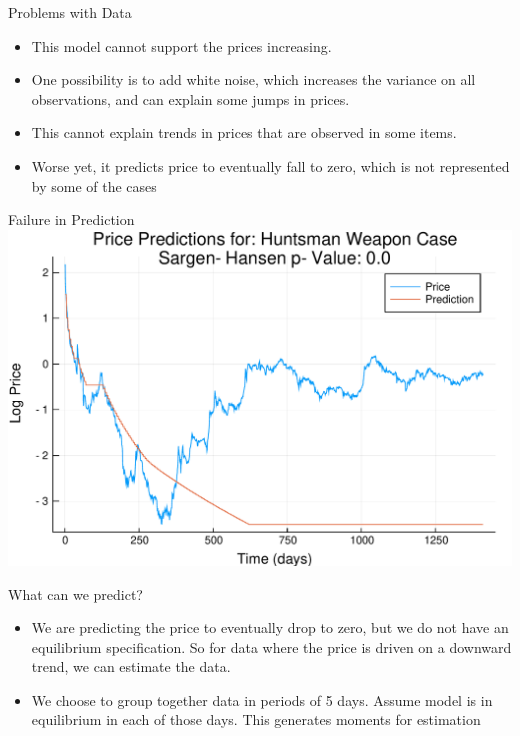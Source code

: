 \documentclass[bigger]{beamer}
\begin{document}
\begin{frame}[label=sec-1-14]{Problems with Data}
\begin{itemize}
\item This model cannot support the prices increasing.
\item One possibility is to add white noise, which increases the variance
on all observations, and can explain some jumps in prices.
\item This cannot explain trends in prices that are observed in some items.
\item Worse yet, it predicts price to eventually fall to zero, which is
not represented by some of the cases
\end{itemize}
\end{frame}

\begin{frame}[label=sec-1-15]{Failure in Prediction}
\includegraphics[width=.9\linewidth]{../Plots/Cases/Cases/HuntsmanWeaponCase.pdf}
\end{frame}

\begin{frame}[label=sec-1-16]{What can we predict?}
\begin{itemize}
\item We are predicting the price to eventually drop to zero, but we do
not have an equilibrium specification. So for data where the price
is driven on a downward trend, we can estimate the data.
\item We choose to group together data in periods of 5 days. Assume model
is in equilibrium in each of those days. This generates moments for
estimation
\end{itemize}
\end{frame}
\end{document}
